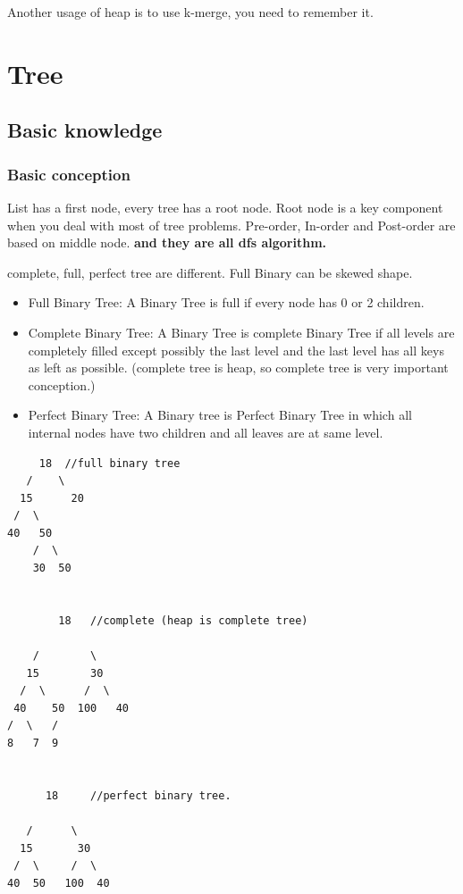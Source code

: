 \documentclass[a4paper,11pt,twoside]{book}
\begin{document}
 
	\par Another usage of heap is to use k-merge, you need to remember it. 


\section{Tree}
\subsection{Basic knowledge}
\subsubsection{Basic conception}

	
	\par List has a first node, every tree has a root node. Root node is a key component when you deal with most of tree problems. Pre-order, In-order and Post-order are based on middle node. \textbf{and they are all dfs algorithm.}

	\par complete, full, perfect tree are different. Full Binary can be skewed shape. 
	
\begin{itemize}
	\item Full Binary Tree: A Binary Tree is full if every node has 0 or 2 children. 
	
	
	\item Complete Binary Tree: A Binary Tree is complete Binary Tree if all levels are completely filled except possibly the last level and the last level has all keys as left as possible. (complete tree is heap, so complete tree is very important conception.)
	
	\item Perfect Binary Tree: A Binary tree is Perfect Binary Tree in which all internal nodes have two children and all leaves are at same level.
\end{itemize}
	
\begin{verbatim}
     18  //full binary tree
   /    \   
  15      20    
 /  \       
40   50   
	/  \
	30  50
	
	
	    18   //complete (heap is complete tree)
	     
    /        \  
   15        30  
  /  \      /  \
 40    50  100   40
/  \   /
8   7  9 
	
	
      18     //perfect binary tree.
      
   /      \  
  15       30  
 /  \     /  \
40  50   100  40
\end{verbatim}
\end{document}
